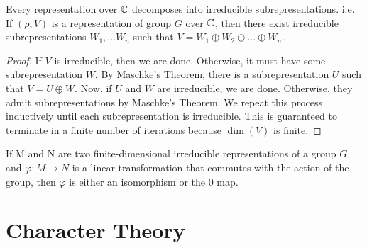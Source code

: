 \begin{theorem}
    Every representation over $\mathbb{C}$ decomposes into irreducible subrepresentations. i.e.
    If $(\rho, V)$ is a representation of group $G$ over $\mathbb{C}$, then there exist irreducible subrepresentations 
    $W_1, ...  W_n$ such that $V = W_1 \oplus W_2 \oplus ... \oplus W_n$.
\end{theorem}

\begin{proof}
    If $V$ is irreducible, then we are done. Otherwise, it must have some subrepresentation $W$. By Maschke's 
    Theorem, there is a subrepresentation $U$ such that $V = U \oplus W$. Now, if $U$ and $W$ are irreducible, we 
    are done. Otherwise, they admit subrepresentations by Maschke's Theorem. We repeat this process inductively 
    until each subrepresentation is irreducible. This is guaranteed to terminate in a finite number of iterations 
    because $\dim(V)$ is finite.
\end{proof}


\begin{theorem}
    If M and N are two finite-dimensional irreducible representations of a group $G$, and $\varphi:M \to N$ is a 
    linear transformation that commutes with the action of the group, then $\varphi$ is either an isomorphism or 
    the $0$ map.
\end{theorem}



            



\section{Character Theory}


